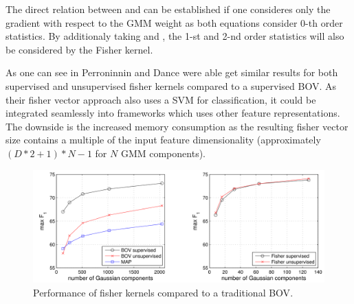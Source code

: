 The direct relation between  and  can be established if one consideres only the gradient with respect to the \ac{GMM} weight as both equations consider 0-th order statistics. By additionaly taking  and , the 1-st and 2-nd order statistics will also be considered by the Fisher kernel.

As one can see in  Perroninnin and Dance were able get similar results for both supervised and unsupervised fisher kernels compared to a supervised \ac{BOV}. As their fisher vector approach also uses a \ac{SVM} for classification, it could be integrated seamlessly into frameworks which uses other feature representations. The downside is the increased memory consumption as the resulting fisher vector size contains a multiple of the input feature dimensionality (approximately $(D*2+1)*N-1$ for $N$ \ac{GMM} components).

\begin{figure}
\includegraphics[width=\linewidth]{images/fisher_kernel_performance}
\caption{Performance of fisher kernels compared to a traditional \acs{BOV}.}
\label{fig:fisher_kernel_performance}
\end{figure}
